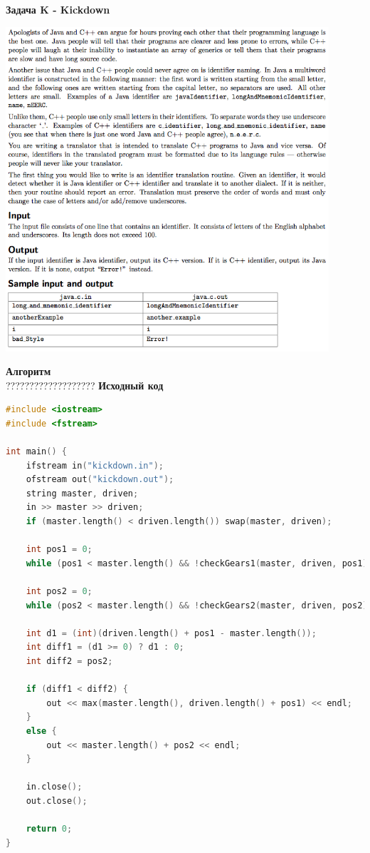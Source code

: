\documentclass[a4paper,12pt]{article}
\begin{document}
\newpage
\textbf{{\large Задача K - Kickdown}} \\
\begin{center}
\includegraphics[width=0.9\textwidth]{CT_S02E09/CT_S02E09_J.png}\\ [1cm]
\end{center}
\textbf{{\large Алгоритм}} \\
{\Huge ???????????????????}
\newpage
\textbf{{\large Исходный код}} \\
\begin{lstlisting}[language=C]
#include <iostream>
#include <fstream>

int main() {
	ifstream in("kickdown.in");
    ofstream out("kickdown.out");
    string master, driven;
    in >> master >> driven;
    if (master.length() < driven.length()) swap(master, driven);
    
    int pos1 = 0;
    while (pos1 < master.length() && !checkGears1(master, driven, pos1)) pos1++;
    
    int pos2 = 0;
    while (pos2 < master.length() && !checkGears2(master, driven, pos2)) pos2++;
    
    int d1 = (int)(driven.length() + pos1 - master.length());
    int diff1 = (d1 >= 0) ? d1 : 0;
    int diff2 = pos2;
    
    if (diff1 < diff2) {
        out << max(master.length(), driven.length() + pos1) << endl;
    }
    else {
        out << master.length() + pos2 << endl;
    }
    
    in.close();
    out.close();
    
    return 0;
}
\end{lstlisting}
\end{document}
